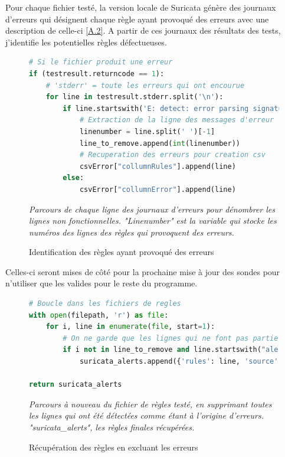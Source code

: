 \vspace{1em}

Pour chaque fichier testé, la version locale de Suricata génère des journaux d'erreurs qui désignent chaque règle ayant provoqué des erreurs avec une description de celle-ci \hyperref[chap:annexe2]{[A.2]}. A partir de ces journaux des résultats des tests, j'identifie les potentielles règles défectueuses.\\

\begin{figure}[h]%
    \center%
    \begin{lstlisting}[language=Python]
# Si le fichier produit une erreur
if (testresult.returncode == 1):
    # 'stderr' = toute les erreurs qui ont encourue
    for line in testresult.stderr.split('\n'):
        if line.startswith('E: detect: error parsing signature'):
            # Extraction de la ligne des messages d'erreur
            linenumber = line.split(' ')[-1]
            line_to_remove.append(int(linenumber))
            # Recuperation des erreurs pour creation csv
            csvError["collumnRules"].append(line)
        else:
            csvError["collumnError"].append(line)
\end{lstlisting}
    {\small
    \textit{Parcours de chaque ligne des journaux d'erreurs pour dénombrer les lignes non fonctionnelles. "Linenumber" est la variable qui stocke les numéros des lignes des règles qui provoquent des erreurs.}
    }
    \caption[Identification des règles ayant provoqué des erreurs]{Identification des règles ayant provoqué des erreurs}\label{fig:IdentRulesError}
\end{figure}

\vspace{1em}

Celles-ci seront mises de côté pour la prochaine mise à jour des sondes pour n'utiliser que les valides pour le reste du programme.\\

\begin{figure}[h]%
    \center%
    \begin{lstlisting}[language=Python]
# Boucle dans les fichiers de regles
with open(filepath, 'r') as file:
    for i, line in enumerate(file, start=1):
        # On ne garde que les lignes qui ne font pas partie des erreurs
        if i not in line_to_remove and line.startswith("alert "):
            suricata_alerts.append({'rules': line, 'source': sourceName})

return suricata_alerts
\end{lstlisting}
    {\small
    \textit{Parcours à nouveau du fichier de règles testé, en supprimant toutes les lignes qui ont été détectées comme étant à l'origine d'erreurs. "suricata\_alerts", les règles finales récupérées.}
    }
    \caption[Récupération des règles en excluant les erreurs]{Récupération des règles en excluant les erreurs}\label{fig:GetRules}
\end{figure}

